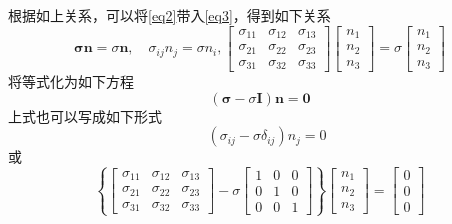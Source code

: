 \documentclass[12pt, a4paper]{ctexart}
\begin{document}
根据如上关系，可以将\eqref{eq2}带入\eqref{eq3}，得到如下关系
\begin{equation}
\mathbf{\sigma} \mathbf{n}=\sigma \mathbf{n}, \quad \sigma_{i j} n_{j}=\sigma n_{i}, \left[ \begin{array}{ccc}{\sigma_{11}} & {\sigma_{12}} & {\sigma_{13}} \\ {\sigma_{21}} & {\sigma_{22}} & {\sigma_{23}} \\ {\sigma_{31}} & {\sigma_{32}} & {\sigma_{33}}\end{array}\right] \left[ \begin{array}{c}{n_{1}} \\ {n_{2}} \\ {n_{3}}\end{array}\right]=\sigma \left[ \begin{array}{l}{n_{1}} \\ {n_{2}} \\ {n_{3}}\end{array}\right]
\end{equation}
将等式化为如下方程
\begin{equation}
(\boldsymbol{\sigma}-\sigma \mathbf{I}) \mathbf{n}=\mathbf{0}
\end{equation}
上式也可以写成如下形式
\begin{equation}
\quad\left(\sigma_{i j}-\sigma \delta_{i j}\right) n_{j}=0
\end{equation}
或
\begin{equation}
\left\{\left[ \begin{array}{ccc}{\sigma_{11}} & {\sigma_{12}} & {\sigma_{13}} \\ {\sigma_{21}} & {\sigma_{22}} & {\sigma_{23}} \\ {\sigma_{31}} & {\sigma_{32}} & {\sigma_{33}}\end{array}\right]-\sigma \left[ \begin{array}{ccc}{1} & {0} & {0} \\ {0} & {1} & {0} \\ {0} & {0} & {1}\end{array}\right]\right\} \left[ \begin{array}{c}{n_{1}} \\ {n_{2}} \\ {n_{3}}\end{array}\right]=\left[ \begin{array}{c}{0} \\ {0} \\ {0}\end{array}\right]
\end{equation}
\end{document}
